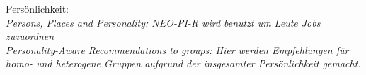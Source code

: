 \documentclass[nochapterpage,bigchapter,linedtoc,longdoc,colorback,accentcolor=tud3b,oneside]{tudreport}
\begin{document}
Persönlichkeit:\\

\textit{Persons, Places and Personality: NEO-PI-R wird benutzt um Leute Jobs zuzuordnen \cite{costa1995persons}}\\

\textit{Personality-Aware Recommendations to groups: Hier werden Empfehlungen für homo- und heterogene Gruppen aufgrund der insgesamter Persönlichkeit gemacht. \cite{recio2009personality}}\\





\end{document}
